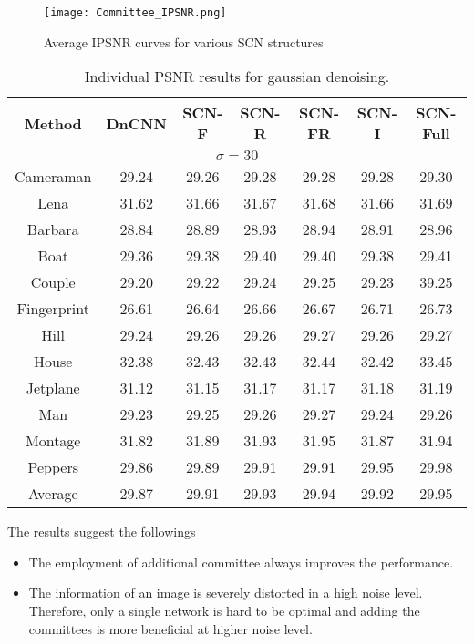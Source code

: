 \documentclass[journal]{IEEEtran}
\begin{document}
\begin{figure}
	\centering
	\texttt{[image: Committee\_IPSNR.png]}\\
	\caption{Average IPSNR curves for various SCN structures}
	\label{fig:Committee_IPSNR}
\end{figure} 

\begin{table*}[!]
	\caption{Individual PSNR results for gaussian denoising.}
	\vspace{.0cm}
	\label{table:Committee_Result}
	\centering
	\begin{tabular}{ |c|c|c|c|c|c|c|}
		\hline
		Method & DnCNN & SCN-F & SCN-R & SCN-FR & SCN-I & SCN-Full \\
		\hline
		\multicolumn{7}{c}{ $\sigma=30$}   \\
		\hline
		Cameraman & 29.24 & 29.26 & 29.28 & 29.28 & 29.28 & 29.30 \\
		\hline
		Lena & 31.62 & 31.66  & 31.67 & 31.68 & 31.66 & 31.69\\
		\hline
		Barbara & 28.84 & 28.89 & 28.93 & 28.94 & 28.91 & 28.96  \\
		\hline
		Boat & 29.36 & 29.38 & 29.40 & 29.40 & 29.38 & 29.41 \\		
		\hline
		Couple & 29.20 & 29.22 & 29.24 & 29.25 & 29.23 & 39.25 \\
		\hline		
		Fingerprint & 26.61 & 26.64 & 26.66 & 26.67 & 26.71 & 26.73 \\
		\hline
		Hill & 29.24 & 29.26 & 29.26 & 29.27 & 29.26 & 29.27\\
		\hline
		House & 32.38 & 32.43 & 32.43 & 32.44 & 32.42 & 33.45 \\
		\hline		
		Jetplane & 31.12 & 31.15 & 31.17 & 31.17 & 31.18 & 31.19 \\
		\hline
		Man & 29.23 & 29.25 & 29.26 & 29.27 & 29.24 & 29.26 \\
		\hline
		Montage & 31.82 & 31.89 & 31.93 & 31.95 & 31.87 & 31.94\\
		\hline	
		Peppers & 29.86 & 29.89 & 29.91 & 29.91 & 29.95 & 29.98 \\
		\hline
		\hline
		Average & 29.87 & 29.91 & 29.93 & 29.94 & 29.92 & 29.95 \\
		\hline
	\end{tabular}
\end{table*}

The results suggest the followings

\begin{itemize}
\item The employment of additional committee always improves the performance. 
\item The information of an image is severely distorted in a high noise level. 
Therefore, only a single network is hard to be optimal and adding the committees
is more beneficial at higher noise level. 
\end{itemize}
\end{document}
